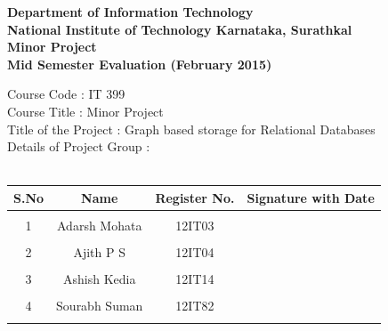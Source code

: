 \documentclass[12pt, oneside]{book}
\begin{document}
\thispagestyle{empty}
\pagebreak
\begin{center}
\Large
\textbf{Department of Information Technology} \\
\normalsize
\textbf{National Institute of Technology Karnataka, Surathkal} \\
\vspace{1cm} \Large
\textbf{Minor Project} \\ \vspace{0.5cm}
\textbf{Mid Semester Evaluation (February 2015)}
\vspace{1cm}
\end{center}
Course Code : IT 399 \\
Course Title : Minor Project \\
Title of the Project : Graph based storage for Relational Databases \\
Details of Project Group : \\
\vspace{5mm}
\\
\begin{table}[h!]
  \begin{center}
   \begin{tabular}{ p{} | p{} | p{} | p{} }
      \hline
      \multicolumn{1}{|c|}{\textbf{S.No}} & \multicolumn{1}{c|}{\textbf{Name}} & \multicolumn{1}{c|}{\textbf{Register No.}} & \multicolumn{1}{c|}{\textbf{Signature with Date}} \\ \hline
      \multicolumn{1}{c}{} & \multicolumn{1}{c}{} & \multicolumn{1}{c}{} & \multicolumn{1}{c}{\hspace{4cm}}\\
      \multicolumn{1}{c}{1} & \multicolumn{1}{c}{Adarsh Mohata} & \multicolumn{1}{c}{12IT03} & \multicolumn{1}{c}{}\\
      \multicolumn{1}{c}{} & \multicolumn{1}{c}{} & \multicolumn{1}{c}{} & \multicolumn{1}{c}{}\\
      \multicolumn{1}{c}{2} & \multicolumn{1}{c}{Ajith P S} & \multicolumn{1}{c}{12IT04} & \multicolumn{1}{c}{}\\
      \multicolumn{1}{c}{} & \multicolumn{1}{c}{} & \multicolumn{1}{c}{} & \multicolumn{1}{c}{}\\
      \multicolumn{1}{c}{3} & \multicolumn{1}{c}{Ashish Kedia} & \multicolumn{1}{c}{12IT14} & \multicolumn{1}{c}{}\\
      \multicolumn{1}{c}{} & \multicolumn{1}{c}{} & \multicolumn{1}{c}{} & \multicolumn{1}{c}{}\\
      \multicolumn{1}{c}{4} & \multicolumn{1}{c}{Sourabh Suman} & \multicolumn{1}{c}{12IT82} & \multicolumn{1}{c}{}\\
      \multicolumn{1}{c}{} & \multicolumn{1}{c}{} & \multicolumn{1}{c}{} & \multicolumn{1}{c}{}\\
   \end{tabular}

  \end{center}

\end{table}
\end{document}
